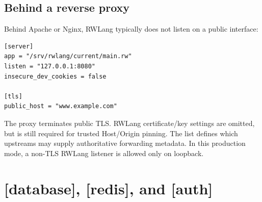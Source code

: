 \subsection*{Behind a reverse proxy}

Behind Apache or Nginx, RWLang typically does not listen on a public interface:

\begin{lstlisting}
[server]
app = "/srv/rwlang/current/main.rw"
listen = "127.0.0.1:8080"
insecure_dev_cookies = false

[tls]
public_host = "www.example.com"
\end{lstlisting}

The proxy terminates public TLS. RWLang certificate/key settings are omitted, but  is still required for trusted Host/Origin pinning. The  list defines which upstreams may supply authoritative forwarding metadata. In this production mode, a non-TLS RWLang listener is allowed only on loopback.

\section{[database], [redis], and [auth]}

